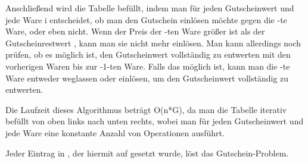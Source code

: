 \begin{aufgabe}
\begin{teile}
	Anschließend wird die Tabelle befüllt, indem man für jeden Gutscheinwert  und jede Ware i entscheidet, ob man den Gutschein einlösen möchte gegen die -te Ware, oder eben nicht. Wenn der Preis der -ten Ware größer ist als der Gutscheinrestwert , kann man sie nicht mehr einlösen. Man kann allerdings noch prüfen, ob es möglich ist, den Gutscheinwert  vollständig zu entwerten mit den vorherigen Waren bis zur -1-ten Ware. Falls das möglich ist, kann man die -te Ware entweder weglassen oder einlösen, um den Gutscheinwert  vollständig zu entwerten.

Die Laufzeit dieses Algorithmus beträgt O(n*G), da man die Tabelle iterativ befüllt von oben links nach unten rechts, wobei man für jeden Gutscheinwert und jede Ware eine konstante Anzahl von Operationen ausführt. 

Jeder Eintrag in , der hiermit auf  gesetzt wurde, löst das Gutschein-Problem. \\

\end{teile}		
\end{aufgabe}

